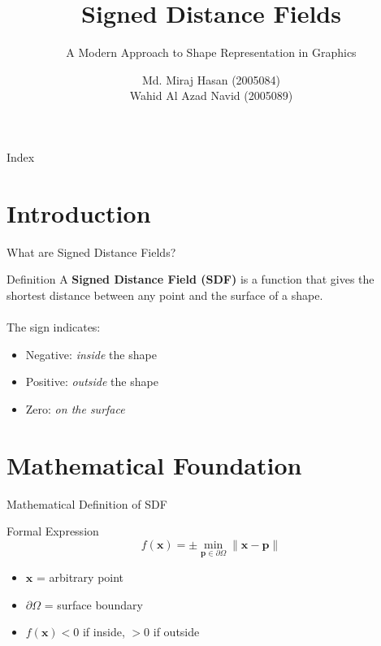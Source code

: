 

\title{Signed Distance Fields}
\subtitle{A Modern Approach to Shape Representation in Graphics}
\author{Md. Miraj Hasan (2005084)\\
Wahid Al Azad Navid (2005089)}



\begin{frame}
  \titlepage
\end{frame}

\begin{frame}{Index}
  \vspace{0.5cm}
  \tiny
  \tableofcontents
\end{frame}

\section{Introduction}
\begin{frame}{What are Signed Distance Fields?}
  \begin{conceptbox}{Definition}
    A \textbf{Signed Distance Field (SDF)} is a function that gives the shortest distance between any point and the surface of a shape.
    \\~\\
    \pause %
    The sign indicates:
    \begin{itemize}
      \item<2-> Negative: \textit{inside} the shape
      \item<3-> Positive: \textit{outside} the shape
      \item<4-> Zero: \textit{on the surface}
    \end{itemize}
  \end{conceptbox}
\end{frame}

\section{Mathematical Foundation}
\begin{frame}{Mathematical Definition of SDF}
  \begin{mathbox}{Formal Expression}
    \[
      f(\mathbf{x}) = \pm \min_{\mathbf{p} \in \partial \Omega} \|\mathbf{x} - \mathbf{p}\|
    \]
    \pause
    \begin{itemize}[<+->]
      \item $\mathbf{x}$ = arbitrary point
      \item $\partial \Omega$ = surface boundary
      \item $f(\mathbf{x}) < 0$ if inside, $> 0$ if outside
    \end{itemize}
  \end{mathbox}
\end{frame}


